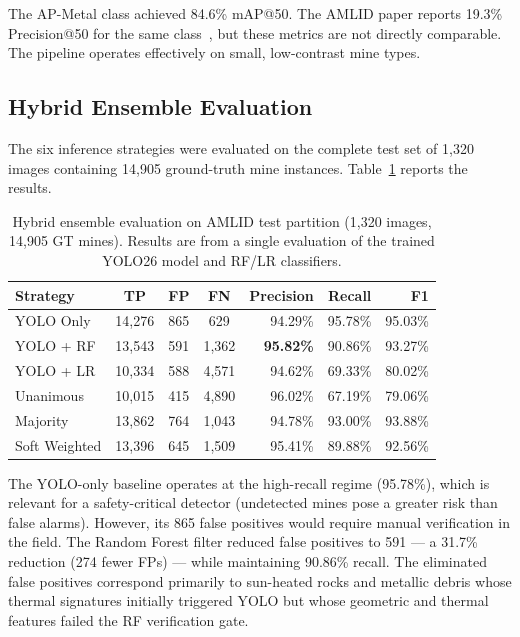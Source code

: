 \documentclass[conference]{IEEEtran}
\begin{document}
The AP-Metal class achieved 84.6\% mAP@50. The AMLID paper reports 19.3\% Precision@50 for the same class~\cite{gallagher2025}, but these metrics are not directly comparable. The pipeline operates effectively on small, low-contrast mine types.

\subsection{Hybrid Ensemble Evaluation}

The six inference strategies were evaluated on the complete test set of 1,320 images containing 14,905 ground-truth mine instances. Table~\ref{tab:ensemble} reports the results.

\begin{table}[t]
  \centering
  \caption{Hybrid ensemble evaluation on AMLID test partition (1,320 images, 14,905 GT mines). Results are from a single evaluation of the trained YOLO26 model and RF/LR classifiers.}
  \label{tab:ensemble}
  \begin{tabular}{lcccrrr}
    \hline
    \textbf{Strategy} & \textbf{TP} & \textbf{FP} & \textbf{FN} & \textbf{Precision} & \textbf{Recall} & \textbf{F1} \\
    \hline
    YOLO Only              & 14,276 & 865  & 629   & 94.29\% & 95.78\% & 95.03\% \\
    YOLO + RF              & 13,543 & 591  & 1,362 & \textbf{95.82\%} & 90.86\% & 93.27\% \\
    YOLO + LR              & 10,334 & 588  & 4,571 & 94.62\% & 69.33\% & 80.02\% \\
    Unanimous              & 10,015 & 415  & 4,890 & 96.02\% & 67.19\% & 79.06\% \\
    Majority               & 13,862 & 764  & 1,043 & 94.78\% & 93.00\% & 93.88\% \\
    Soft Weighted          & 13,396 & 645  & 1,509 & 95.41\% & 89.88\% & 92.56\% \\
    \hline
  \end{tabular}
\end{table}

The YOLO-only baseline operates at the high-recall regime (95.78\%), which is relevant for a safety-critical detector (undetected mines pose a greater risk than false alarms). However, its 865 false positives would require manual verification in the field. The Random Forest filter reduced false positives to 591 --- a 31.7\% reduction (274 fewer FPs) --- while maintaining 90.86\% recall. The eliminated false positives correspond primarily to sun-heated rocks and metallic debris whose thermal signatures initially triggered YOLO but whose geometric and thermal features failed the RF verification gate.
\end{document}
